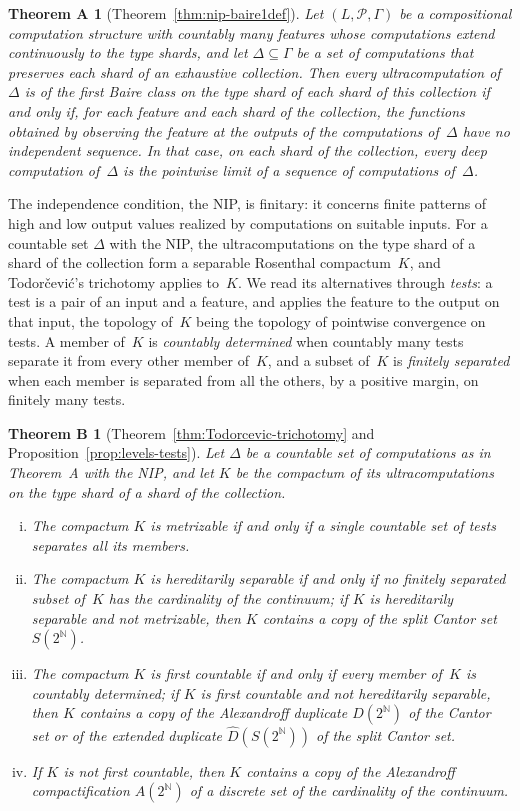 \documentclass[psamsfonts]{amsart}
\newtheorem*{thmA}{Theorem A}
\newtheorem*{thmB}{Theorem B}
\theoremstyle{definition}
\theoremstyle{remark}
\numberwithin{equation}{section}
\begin{document}
\begin{thmA}[Theorem~\ref{thm:nip-baire1def}]
  Let $(L,\mathcal{P},\Gamma)$ be a compositional computation structure with countably many features whose computations extend continuously to the type shards, and let $\Delta\subseteq\Gamma$ be a set of computations that preserves each shard of an exhaustive collection.
  Then every ultracomputation of~$\Delta$ is of the first Baire class on the type shard of each shard of this collection if and only if, for each feature and each shard of the collection, the functions obtained by observing the feature at the outputs of the computations of~$\Delta$ have no independent sequence.
  In that case, on each shard of the collection, every deep computation of~$\Delta$ is the pointwise limit of a sequence of computations of~$\Delta$.
\end{thmA}

The independence condition, the NIP, is finitary: it concerns finite patterns of high and low output values realized by computations on suitable inputs.
For a countable set $\Delta$ with the NIP, the ultracomputations on the type shard of a shard of the collection form a separable Rosenthal compactum~$K$, and Todorčević's trichotomy applies to~$K$.
We read its alternatives through \emph{tests}: a test is a pair of an input and a feature, and applies the feature to the output on that input, the topology of~$K$ being the topology of pointwise convergence on tests.
A member of~$K$ is \emph{countably determined} when countably many tests separate it from every other member of~$K$, and a subset of~$K$ is \emph{finitely separated} when each member is separated from all the others, by a positive margin, on finitely many tests.

\begin{thmB}[Theorem~\ref{thm:Todorcevic-trichotomy} and Proposition~\ref{prop:levels-tests}]
  Let $\Delta$ be a countable set of computations as in Theorem~A with the NIP, and let $K$ be the compactum of its ultracomputations on the type shard of a shard of the collection.
  \begin{enumerate}[(i)]
  \item The compactum $K$ is metrizable if and only if a single countable set of tests separates all its members.
  \item The compactum $K$ is hereditarily separable if and only if no finitely separated subset of~$K$ has the cardinality of the continuum; if $K$ is hereditarily separable and not metrizable, then $K$ contains a copy of the split Cantor set $S(2^{\mathbb{N}})$.
  \item The compactum $K$ is first countable if and only if every member of~$K$ is countably determined; if $K$ is first countable and not hereditarily separable, then $K$ contains a copy of the Alexandroff duplicate $D(2^{\mathbb{N}})$ of the Cantor set or of the extended duplicate $\hat D(S(2^{\mathbb{N}}))$ of the split Cantor set.
  \item If $K$ is not first countable, then $K$ contains a copy of the Alexandroff compactification $A(2^{\mathbb{N}})$ of a discrete set of the cardinality of the continuum.
  \end{enumerate}
\end{thmB}
\end{document}
